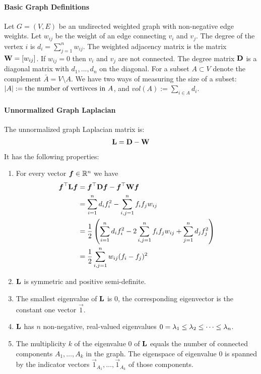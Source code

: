 \paragraph{Basic Graph Definitions}

Let $G=(V,E)$ be an undirected weighted graph with non-negative edge weights. Let $w_{ij}$ be the weight of an edge connecting $v_i$ and $v_j$. The degree of the vertex $i$ is $d_i=\sum_{j=1}^nw_{ij}$. The weighted adjacency matrix is the matrix $\mathbf{W}=[w_{ij}]$. If $w_{ij}=0$ then $v_i$ and $v_j$ are not connected. The degree matrix $\mathbf{D}$ is a diagonal matrix with $d_1,\dotsc,d_n$ on the diagonal. For a subset $A\subset V$ denote the complement $\bar{A}=V\setminus A$. We have two ways of measuring the size of a subset: $\left\vert A\right\vert:=\text{the number of vertivces in }A$, and $vol(A):=\sum_{i\in A}d_i$.

\paragraph{Unnormalized Graph Laplacian}

The unnormalized graph Laplacian matrix is:
\begin{align*}
	\mathbf{L}=\mathbf{D}-\mathbf{W}
\end{align*}
It has the following properties:
\begin{enumerate}
	\item For every vector $\boldsymbol{f}\in\mathbb{R}^n$ we have
	\begin{align*}
		\boldsymbol{f}^\top\mathbf{L}\boldsymbol{f}&=\boldsymbol{f}^\top\mathbf{D}\boldsymbol{f}-\boldsymbol{f}^\top\mathbf{W}\boldsymbol{f} \\
		&=\sum_{i=1}^nd_if_i^2-\sum_{i,j=1}^nf_if_jw_{ij} \\
		&=\frac{1}{2}\left(\sum_{i=1}^nd_if_i^2-2\sum_{i,j=1}^nf_if_jw_{ij}+\sum_{j=1}^nd_jf_j^2\right) \\
		&=\frac{1}{2}\sum_{i,j=1}^nw_{ij}(f_i-f_j)^2
	\end{align*}
	\item $\mathbf{L}$ is symmetric and positive semi-definite.
	\item The smallest eigenvalue of $\mathbf{L}$ is 0, the corresponding eigenvector is the constant one vector $\vec{1}$.
	\item $\mathbf{L}$ has $n$ non-negative, real-valued eigenvalues $0=\lambda_1\leq\lambda_2\leq\cdots\leq\lambda_n$.
	\item The multiplicity $k$ of the eigenvalue 0 of $\mathbf{L}$ equals the number of connected components $A_1,\dotsc,A_k$ in the graph. The eigenspace of eigenvalue 0 is spanned by the indicator vectors $\vec{1}_{A_1},\dotsc,\vec{1}_{A_k}$ of those components.
\end{enumerate}

